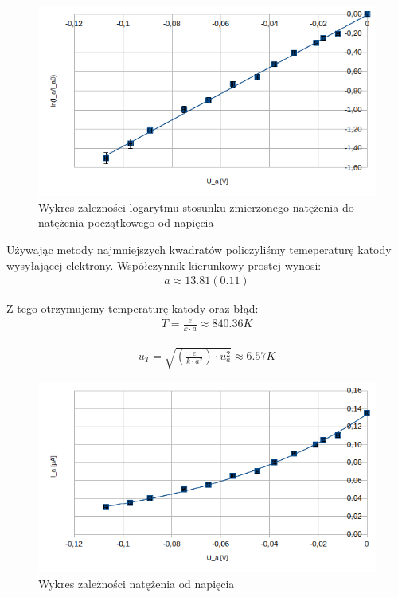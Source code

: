 \documentclass[a4paper]{article}
\begin{document}
\begin{figure}
	\includegraphics[scale=1]{T1_ln_U}
	\centering
	\caption{Wykres zależności logarytmu stosunku zmierzonego natężenia do natężenia początkowego od napięcia}
\end{figure}

Używając metody najmniejszych kwadratów policzyliśmy temeperaturę katody wysyłającej elektrony. Współczynnik kierunkowy prostej wynosi:
\begin{align*}
a \approx 13.81 (0.11)
\end{align*}

Z tego otrzymujemy temperaturę katody oraz błąd:
\begin{align*}
T = \frac{e}{k \cdot a} \approx 840.36 K
\end{align*}

\begin{align*}
u_{T} = \sqrt{(\frac{e}{k \cdot a^2}) \cdot u_{a}^2} \approx 6.57 K
\end{align*}


\begin{figure}
	\includegraphics[scale=1]{T1_Ia_U}
	\centering
	\caption{Wykres zależności natężenia od napięcia}
\end{figure}
\end{document}
